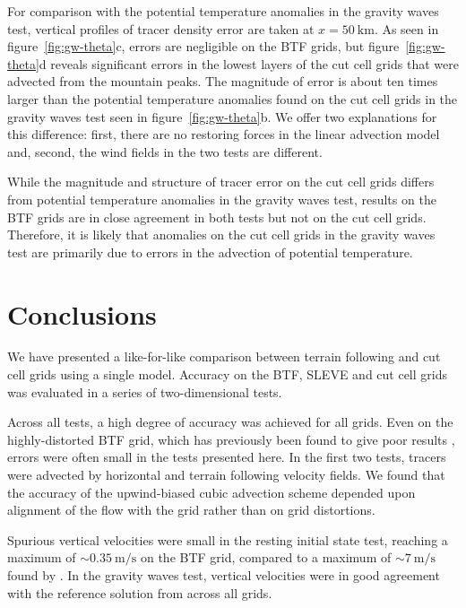 \documentclass{ametsoc}
\begin{document}
For comparison with the potential temperature anomalies in the gravity waves test, vertical profiles of tracer density error are taken at $x = \SI{50}{\kilo\meter}$.  As seen in figure~\ref{fig:gw-theta}c, errors are negligible on the BTF grids, but figure~\ref{fig:gw-theta}d reveals significant errors in the lowest layers of the cut cell grids that were advected from the mountain peaks.  The magnitude of error is about ten times larger than the potential temperature anomalies found on the cut cell grids in the gravity waves test seen in figure~\ref{fig:gw-theta}b.  We offer two explanations for this difference: first, there are no restoring forces in the linear advection model and, second, the wind fields in the two tests are different.

While the magnitude and structure of tracer error on the cut cell grids differs from potential temperature anomalies in the gravity waves test, results on the BTF grids are in close agreement in both tests but not on the cut cell grids.  Therefore, it is likely that anomalies on the cut cell grids in the gravity waves test are primarily due to errors in the advection of potential temperature.

\section{Conclusions}
We have presented a like-for-like comparison between terrain following and cut cell grids using a single model.  Accuracy on the BTF, SLEVE and cut cell grids was evaluated in a series of two-dimensional tests.

Across all tests, a high degree of accuracy was achieved for all grids.  Even on the highly-distorted BTF grid, which has previously been found to give poor results \citep{schaer2002,klemp2011,good2014}, errors were often small in the tests presented here.  In the first two tests, tracers were advected by horizontal and terrain following velocity fields.  We found that the accuracy of the upwind-biased cubic advection scheme depended upon alignment of the flow with the grid rather than on grid distortions.

Spurious vertical velocities were small in the resting initial state test, reaching a maximum of $\sim \SI{0.35}{\meter\per\second}$ on the BTF grid, compared to a maximum of $\sim \SI{7}{\meter\per\second}$ found by \citet{klemp2011}.  In the gravity waves test, vertical velocities were in good agreement with the reference solution from \citet{melvin2010} across all grids.
\end{document}
